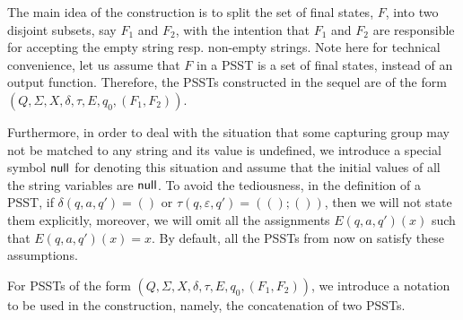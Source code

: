 The main idea of the construction is to split the set of final states, $F$, into two disjoint subsets, say $F_1$ and $F_2$, with the intention that $F_1$  and $F_2$ are responsible for accepting the empty string resp. non-empty strings. Note here for technical convenience, let us assume that $F$ in a PSST is a set of final states, instead of an output function. Therefore, the PSSTs constructed in the sequel are of the form $(Q, \Sigma, X, \delta, \tau, E, q_0, (F_1, F_2))$. 

Furthermore, in order to deal with the situation that some capturing group may not be matched to any string and its value is undefined, we introduce a special symbol $\mathsf{null}$ for denoting this situation and assume that the initial values of all the string variables are $\mathsf{null}$. To avoid the tediousness, in the definition of a PSST, if $\delta(q, a, q') = ()$ or $\tau(q, \varepsilon, q') = ((); ())$, then we will not state them explicitly, moreover, we will omit all the assignments $E(q, a, q')(x)$ such that $E(q, a, q')(x) = x$.
By default, all the PSSTs from now on satisfy these assumptions. 

For PSSTs of the form $(Q, \Sigma, X, \delta, \tau, E, q_0, (F_1, F_2))$, we introduce a notation to be used in the construction, namely, the concatenation of two PSSTs. 

